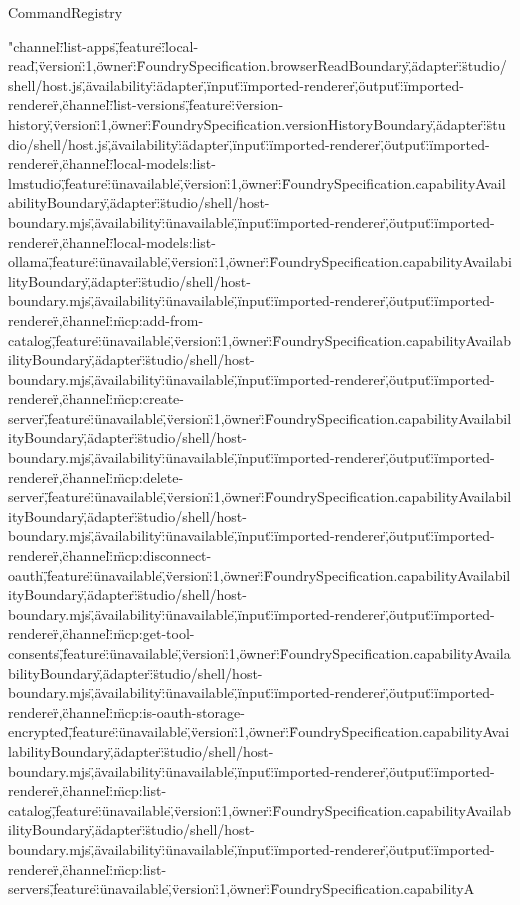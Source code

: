 \begin{lexlean}{CommandRegistry}
\begin{semanticmodule}
{"channel\":\"list-apps\",\"feature\":\"local-read\",\"version\":1,\"owner\":\"FoundrySpecification.browserReadBoundary\",\"adapter\":\"studio/shell/host.js\",\"availability\":\"adapter\",\"input\":\"imported-renderer\",\"output\":\"imported-renderer\"},{\"channel\":\"list-versions\",\"feature\":\"version-history\",\"version\":1,\"owner\":\"FoundrySpecification.versionHistoryBoundary\",\"adapter\":\"studio/shell/host.js\",\"availability\":\"adapter\",\"input\":\"imported-renderer\",\"output\":\"imported-renderer\"},{\"channel\":\"local-models:list-lmstudio\",\"feature\":\"unavailable\",\"version\":1,\"owner\":\"FoundrySpecification.capabilityAvailabilityBoundary\",\"adapter\":\"studio/shell/host-boundary.mjs\",\"availability\":\"unavailable\",\"input\":\"imported-renderer\",\"output\":\"imported-renderer\"},{\"channel\":\"local-models:list-ollama\",\"feature\":\"unavailable\",\"version\":1,\"owner\":\"FoundrySpecification.capabilityAvailabilityBoundary\",\"adapter\":\"studio/shell/host-boundary.mjs\",\"availability\":\"unavailable\",\"input\":\"imported-renderer\",\"output\":\"imported-renderer\"},{\"channel\":\"mcp:add-from-catalog\",\"feature\":\"unavailable\",\"version\":1,\"owner\":\"FoundrySpecification.capabilityAvailabilityBoundary\",\"adapter\":\"studio/shell/host-boundary.mjs\",\"availability\":\"unavailable\",\"input\":\"imported-renderer\",\"output\":\"imported-renderer\"},{\"channel\":\"mcp:create-server\",\"feature\":\"unavailable\",\"version\":1,\"owner\":\"FoundrySpecification.capabilityAvailabilityBoundary\",\"adapter\":\"studio/shell/host-boundary.mjs\",\"availability\":\"unavailable\",\"input\":\"imported-renderer\",\"output\":\"imported-renderer\"},{\"channel\":\"mcp:delete-server\",\"feature\":\"unavailable\",\"version\":1,\"owner\":\"FoundrySpecification.capabilityAvailabilityBoundary\",\"adapter\":\"studio/shell/host-boundary.mjs\",\"availability\":\"unavailable\",\"input\":\"imported-renderer\",\"output\":\"imported-renderer\"},{\"channel\":\"mcp:disconnect-oauth\",\"feature\":\"unavailable\",\"version\":1,\"owner\":\"FoundrySpecification.capabilityAvailabilityBoundary\",\"adapter\":\"studio/shell/host-boundary.mjs\",\"availability\":\"unavailable\",\"input\":\"imported-renderer\",\"output\":\"imported-renderer\"},{\"channel\":\"mcp:get-tool-consents\",\"feature\":\"unavailable\",\"version\":1,\"owner\":\"FoundrySpecification.capabilityAvailabilityBoundary\",\"adapter\":\"studio/shell/host-boundary.mjs\",\"availability\":\"unavailable\",\"input\":\"imported-renderer\",\"output\":\"imported-renderer\"},{\"channel\":\"mcp:is-oauth-storage-encrypted\",\"feature\":\"unavailable\",\"version\":1,\"owner\":\"FoundrySpecification.capabilityAvailabilityBoundary\",\"adapter\":\"studio/shell/host-boundary.mjs\",\"availability\":\"unavailable\",\"input\":\"imported-renderer\",\"output\":\"imported-renderer\"},{\"channel\":\"mcp:list-catalog\",\"feature\":\"unavailable\",\"version\":1,\"owner\":\"FoundrySpecification.capabilityAvailabilityBoundary\",\"adapter\":\"studio/shell/host-boundary.mjs\",\"availability\":\"unavailable\",\"input\":\"imported-renderer\",\"output\":\"imported-renderer\"},{\"channel\":\"mcp:list-servers\",\"feature\":\"unavailable\",\"version\":1,\"owner\":\"FoundrySpecification.capabilityA}
\end{semanticmodule}
\end{lexlean}
